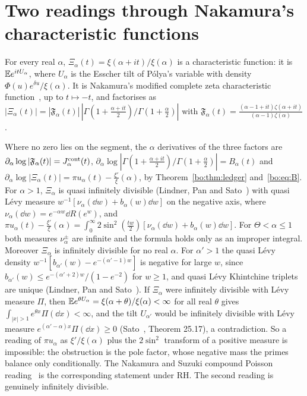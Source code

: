 \section{Two readings through Nakamura's characteristic functions}\label{bo:sec:nakamura}

For every real $\alpha$, $\Xi_\alpha(t)=\xi(\alpha+it)/\xi(\alpha)$ is a characteristic function: it is $\mathbb{E} e^{itU_\alpha}$, where $U_\alpha$ is the Esscher tilt of P\'olya's variable with density $\Phi(u)e^{\delta u}/\xi(\alpha)$. It is Nakamura's modified complete zeta characteristic function~\cite{Nakamura15}, up to $t\mapsto-t$, and factorises as $|\Xi_\alpha(t)|=|\mathfrak F_\alpha(t)|\,|\Gamma(1+\frac{\alpha+it}2)/\Gamma(1+\frac\alpha2)|$ with $\mathfrak F_\alpha(t)=\frac{(\alpha-1+it)\zeta(\alpha+it)}{(\alpha-1)\zeta(\alpha)}$.

Where no zero lies on the segment, the $\alpha$ derivatives of the three factors are $\partial_\alpha\log|\mathfrak F_\alpha(t)|=J^{\rm cont}_\alpha(t)$, $\partial_\alpha\log|\Gamma(1+\frac{\alpha+it}2)/\Gamma(1+\frac\alpha2)|=B_\alpha(t)$ and $\partial_\alpha\log|\Xi_\alpha(t)|=\pi u_\alpha(t)-\frac{\xi'}{\xi}(\alpha)$, by Theorem~\ref{bo:thm:ledger} and~\eqref{bo:eq:B}. For $\alpha>1$, $\Xi_\alpha$ is quasi infinitely divisible (Lindner, Pan and Sato~\cite{LPS18}) with quasi L\'evy measure $w^{-1}[\nu_\alpha(\dd w)+b_\alpha(w)\dd w]$ on the negative axis, where $\nu_\alpha(\dd w)=e^{-\alpha w}\dd R(e^w)$, and $\pi u_\alpha(t)-\frac{\xi'}{\xi}(\alpha)=\int_0^\infty2\sin^2(\frac{tw}2)[\nu_\alpha(\dd w)+b_\alpha(w)\dd w]$. For $\Theta<\alpha\le1$ both measures $\nu_\alpha^\pm$ are infinite and the formula holds only as an improper integral. Moreover $\Xi_\alpha$ is infinitely divisible for no real $\alpha$. For $\alpha'>1$ the quasi L\'evy density $w^{-1}[b_{\alpha'}(w)-e^{-(\alpha'-1)w}]$ is negative for large $w$, since $b_{\alpha'}(w)\le e^{-(\alpha'+2)w}/(1-e^{-2})$ for $w\ge1$, and quasi L\'evy Khintchine triplets are unique (Lindner, Pan and Sato~\cite{LPS18}). If $\Xi_\alpha$ were infinitely divisible with L\'evy measure $\Pi$, then $\mathbb{E} e^{\theta U_\alpha}=\xi(\alpha+\theta)/\xi(\alpha)<\infty$ for all real $\theta$ gives $\int_{|x|>1}e^{\theta x}\Pi(\dd x)<\infty$, and the tilt $U_{\alpha'}$ would be infinitely divisible with L\'evy measure $e^{(\alpha'-\alpha)x}\Pi(\dd x)\ge0$ (Sato~\cite{Sato99}, Theorem 25.17), a contradiction. So a reading of $\pi u_\alpha$ as $\xi'/\xi(\alpha)$ plus the $2\sin^2$ transform of a positive measure is impossible: the obstruction is the pole factor, whose negative mass the primes balance only conditionally. The Nakamura and Suzuki compound Poisson reading~\cite{NakamuraSuzuki23} is the corresponding statement under RH. The second reading is genuinely infinitely divisible.

